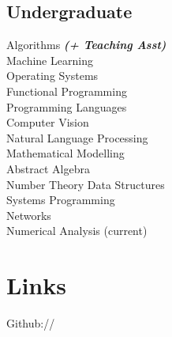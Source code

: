 \documentclass[]{deedy-resume-openfont}
\begin{document}
\begin{minipage}[t]{0.33\textwidth}
\subsection{Undergraduate}
Algorithms {\footnotesize \textit{\textbf{(+ Teaching Asst)}}}\\
Machine Learning \\
Operating Systems \\
Functional Programming \\
Programming Languages \\
Computer Vision \\
Natural Language Processing \\
Mathematical Modelling \\
Abstract Algebra\\
Number Theory
Data Structures\\
Systems Programming\\
Networks\\
Numerical Analysis (current)\\
\sectionsep


\section{Links}
Github:// \href{https://github.com/dtwitty}{}
\sectionsep

%
%

\end{minipage} 
\hfill
\end{document}
